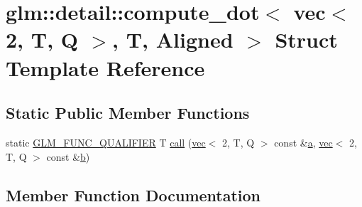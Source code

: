 \hypertarget{structglm_1_1detail_1_1compute__dot_3_01vec_3_012_00_01_t_00_01_q_01_4_00_01_t_00_01_aligned_01_4}{}\section{glm\+:\+:detail\+:\+:compute\+\_\+dot$<$ vec$<$ 2, T, Q $>$, T, Aligned $>$ Struct Template Reference}
\label{structglm_1_1detail_1_1compute__dot_3_01vec_3_012_00_01_t_00_01_q_01_4_00_01_t_00_01_aligned_01_4}
\subsection*{Static Public Member Functions}
\begin{DoxyCompactItemize}
\item 
static \hyperlink{setup_8hpp_a33fdea6f91c5f834105f7415e2a64407}{G\+L\+M\+\_\+\+F\+U\+N\+C\+\_\+\+Q\+U\+A\+L\+I\+F\+I\+ER} T \hyperlink{structglm_1_1detail_1_1compute__dot_3_01vec_3_012_00_01_t_00_01_q_01_4_00_01_t_00_01_aligned_01_4_a8ed20e236d03a8f963b61e6e7b7a219f}{call} (\hyperlink{structglm_1_1vec}{vec}$<$ 2, T, Q $>$ const \&\hyperlink{_s_d_l__opengl__glext_8h_a3309789fc188587d666cda5ece79cf82}{a}, \hyperlink{structglm_1_1vec}{vec}$<$ 2, T, Q $>$ const \&\hyperlink{_s_d_l__opengl__glext_8h_a0f71581a41fd2264c8944126dabbd010}{b})
\end{DoxyCompactItemize}


\subsection{Member Function Documentation}
\mbox{\label{structglm_1_1detail_1_1compute__dot_3_01vec_3_012_00_01_t_00_01_q_01_4_00_01_t_00_01_aligned_01_4_a8ed20e236d03a8f963b61e6e7b7a219f}} 
